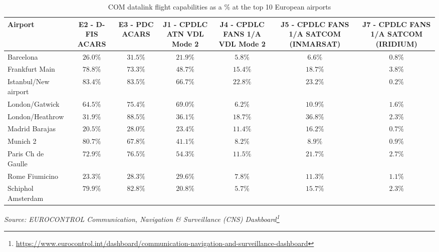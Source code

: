 \documentclass[
  11pt,
  a4paper,
]{book}
\DeclareRobustCommand{\href}[2]{#2\footnote{\url{#1}}}
\begin{document}
\hypertarget{tbl-com-flight_top10}{}
\setlength{\LTpost}{0mm}
\begin{longtable}{lcccccc}
\caption{\label{tbl-com-flight_top10}COM datalink flight capabilities as a \% at the top 10 European airports }\tabularnewline

\toprule
Airport & E2 - D-FIS ACARS & E3 - PDC ACARS & J1 - CPDLC ATN VDL Mode 2 & J4 - CPDLC FANS 1/A VDL Mode 2 & J5 - CPDLC FANS 1/A SATCOM (INMARSAT) & J7 - CPDLC FANS 1/A SATCOM (IRIDIUM) \\ 
\midrule
Barcelona & $26.0\%$ & $31.5\%$ & $21.9\%$ & $5.8\%$ & $6.6\%$ & $0.8\%$ \\ 
Frankfurt Main & $78.8\%$ & $73.3\%$ & $48.7\%$ & $15.4\%$ & $18.7\%$ & $3.8\%$ \\ 
Istanbul/New airport & $83.4\%$ & $83.5\%$ & $66.7\%$ & $22.8\%$ & $23.2\%$ & $0.2\%$ \\ 
London/Gatwick & $64.5\%$ & $75.4\%$ & $69.0\%$ & $6.2\%$ & $10.9\%$ & $1.6\%$ \\ 
London/Heathrow & $31.9\%$ & $88.5\%$ & $36.1\%$ & $18.7\%$ & $36.8\%$ & $2.3\%$ \\ 
Madrid Barajas & $20.5\%$ & $28.0\%$ & $23.4\%$ & $11.4\%$ & $16.2\%$ & $0.7\%$ \\ 
Munich 2 & $80.7\%$ & $67.8\%$ & $41.1\%$ & $8.2\%$ & $8.9\%$ & $0.9\%$ \\ 
Paris Ch de Gaulle & $72.9\%$ & $76.5\%$ & $54.3\%$ & $11.5\%$ & $21.7\%$ & $2.7\%$ \\ 
Rome Fiumicino & $23.3\%$ & $28.3\%$ & $29.6\%$ & $7.8\%$ & $11.3\%$ & $1.1\%$ \\ 
Schiphol Amsterdam & $79.9\%$ & $82.8\%$ & $20.8\%$ & $5.7\%$ & $15.7\%$ & $2.3\%$ \\ 
\bottomrule
\end{longtable}
\begin{minipage}{\linewidth}
\emph{Source: \href{https://www.eurocontrol.int/dashboard/communication-navigation-and-surveillance-dashboard}{EUROCONTROL Communication, Navigation \& Surveillance (CNS) Dashboard}}\\
\end{minipage}
\end{document}

